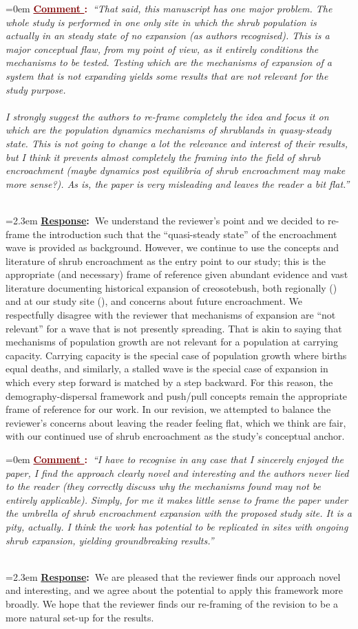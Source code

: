 \documentclass[12pt]{article}
\newcounter{cN}
\newcommand{\comment}[1]{
	\vspace{2em}
	\refstepcounter{cN} %
	\noindent \hangindent=0em \textbf{\textcolor{Maroon}{\uline{Comment \thecN}:~}}\emph{``#1''}
	}
\newcommand{\response}[1]{
	\\[0.25em]
	\hangindent=2.3em \textbf{\textcolor{NavyBlue}{\uline{Response}:~}}#1
	}
\begin{document}
\comment{That said, this manuscript has one major problem. The whole study is performed in one only site in which the shrub population is actually in an steady state of no expansion (as authors recognised). This is a major conceptual flaw, from my point of view, as it entirely conditions the mechanisms to be tested. Testing which are the mechanisms of expansion of a system that is not expanding yields some results that are not relevant for the study purpose.
\\
\\
I strongly suggest the authors to re-frame completely the idea and focus it on which are the population dynamics mechanisms of shrublands in quasy-steady state. This is not going to change a lot the relevance and interest of their results, but I think it prevents almost completely the framing into the field of shrub encroachment (maybe dynamics post equilibria of shrub encroachment may make more sense?). As is, the paper is very misleading and leaves the reader a bit flat.}
\response{We understand the reviewer's point and we decided to re-frame the introduction such that the ``quasi-steady state'' of the encroachment wave is provided as background. However, we continue to use the concepts and literature of shrub encroachment as the entry point to our study; this is the appropriate (and necessary) frame of reference given abundant evidence and vast literature documenting historical expansion of creosotebush, both regionally () and at our study site (), and concerns about future encroachment. We respectfully disagree with the reviewer that mechanisms of expansion are ``not relevant'' for a wave that is not presently spreading. That is akin to saying that mechanisms of population growth are not relevant for a population at carrying capacity. Carrying capacity is the special case of population growth where births equal deaths, and similarly, a stalled wave is the special case of expansion in which every step forward is matched by a step backward. For this reason, the demography-dispersal framework and push/pull concepts remain the appropriate frame of reference for our work. In our revision, we attempted to balance the reviewer's concerns about leaving the reader feeling flat, which we think are fair, with our continued use of shrub encroachment as the study's conceptual anchor.}

\comment{I have to recognise in any case that I sincerely enjoyed the paper, I find the approach clearly novel and interesting and the authors never lied to the reader (they correctly discuss why the mechanisms found may not be entirely applicable). Simply, for me it makes little sense to frame the paper under the umbrella of shrub encroachment expansion with the proposed study site. It is a pity, actually. I think the work has potential to be replicated in sites with ongoing shrub expansion, yielding groundbreaking results.}
\response{We are pleased that the reviewer finds our approach novel and interesting, and we agree about the potential to apply this framework more broadly. We hope that the reviewer finds our re-framing of the revision to be a more natural set-up for the results.}
\end{document}
